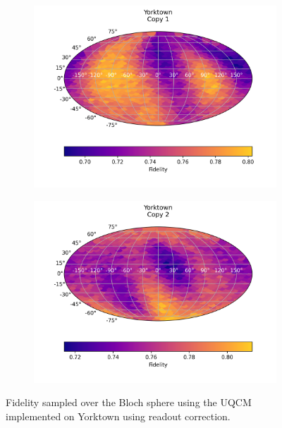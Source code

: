 \begin{figure}[H]
    \centering
    \begin{subfigure}{.5\textwidth}
      \centering
      \includegraphics[width=\textwidth]{Figures/UQCM/IBM/FullSphere/results_corrected_ibmqx2_copy1.png}
    \end{subfigure}%
    \begin{subfigure}{.5\textwidth}
      \centering
      \includegraphics[width=\textwidth]{Figures/UQCM/IBM/FullSphere/results_corrected_ibmqx2_copy2.png}
    \end{subfigure}
\caption{Fidelity sampled over the Bloch sphere using the UQCM implemented on Yorktown using readout correction.}
    \label{fig:uqcm_york}
\end{figure}



